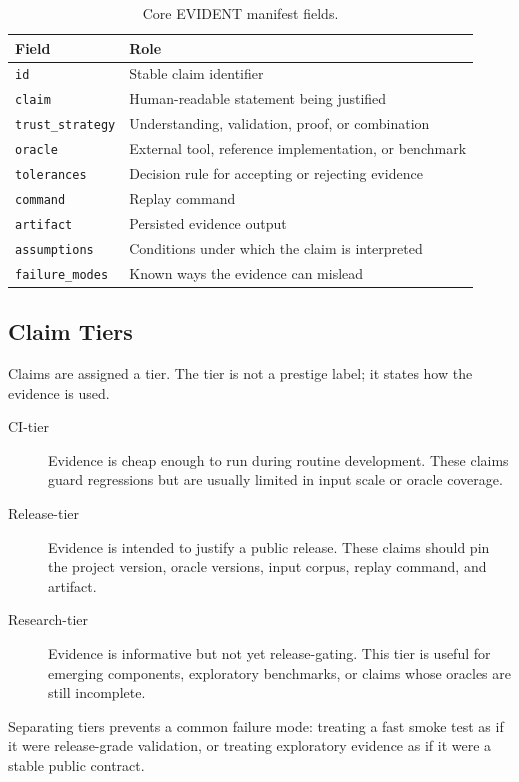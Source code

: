 \documentclass[10pt,twoside]{article}
\begin{document}
\begin{table}[h]
\centering
\caption{Core EVIDENT manifest fields.}
\begin{tabular}{ll}
\toprule
Field & Role \\
\midrule
\texttt{id} & Stable claim identifier \\
\texttt{claim} & Human-readable statement being justified \\
\texttt{trust\_strategy} & Understanding, validation, proof, or combination \\
\texttt{oracle} & External tool, reference implementation, or benchmark \\
\texttt{tolerances} & Decision rule for accepting or rejecting evidence \\
\texttt{command} & Replay command \\
\texttt{artifact} & Persisted evidence output \\
\texttt{assumptions} & Conditions under which the claim is interpreted \\
\texttt{failure\_modes} & Known ways the evidence can mislead \\
\bottomrule
\end{tabular}
\end{table}

\subsection{Claim Tiers}

Claims are assigned a tier. The tier is not a prestige label; it states how the
evidence is used.

\begin{description}
  \item[CI-tier] Evidence is cheap enough to run during routine development.
        These claims guard regressions but are usually limited in input scale
        or oracle coverage.
  \item[Release-tier] Evidence is intended to justify a public release. These
        claims should pin the project version, oracle versions, input corpus,
        replay command, and artifact.
  \item[Research-tier] Evidence is informative but not yet release-gating. This
        tier is useful for emerging components, exploratory benchmarks, or
        claims whose oracles are still incomplete.
\end{description}

Separating tiers prevents a common failure mode: treating a fast smoke test as
if it were release-grade validation, or treating exploratory evidence as if it
were a stable public contract.
\end{document}
